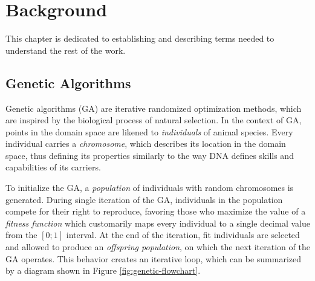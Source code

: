 \chapter{Background}
This chapter is dedicated to establishing and describing terms needed to understand the rest of the work.

\section{Genetic Algorithms}
Genetic algorithms (GA) are iterative randomized optimization methods, which are inspired by the biological process of natural selection. In the context of GA, points in the domain space are likened to \textit{individuals} of animal species. Every individual carries a \textit{chromosome}, which describes its location in the domain space, thus defining its properties similarly to the way DNA defines skills and capabilities of its carriers.

To initialize the GA, a \textit{population} of individuals with random chromosomes is generated. During single iteration of the GA, individuals in the population compete for their right to reproduce, favoring those who maximize the value of a \textit{fitness function} which customarily maps every individual to a single decimal value from the $[0;1]$ interval. At the end of the iteration, fit individuals are selected and allowed to produce an \textit{offspring population}, on which the next iteration of the GA operates. This behavior creates an iterative loop, which can be summarized by a diagram shown in Figure \ref{fig:genetic-flowchart}.

